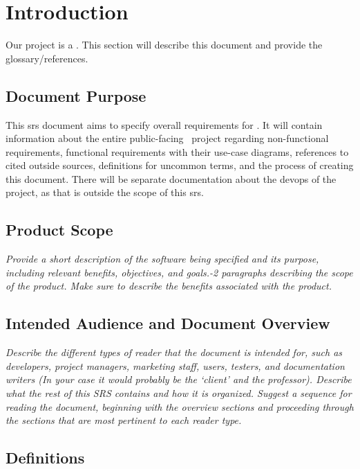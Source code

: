 
\section{Introduction}
    Our project is a \todo. This section will describe this document and provide the glossary/references.
    \subsection{Document Purpose}
        This \gls{srs} document aims to specify overall requirements for \projectName. It will contain information about the entire public-facing \projectName\ project regarding non-functional requirements, functional requirements with their use-case diagrams, references to cited outside sources, definitions for uncommon terms, and the process of creating this document. There will be separate documentation about the \gls{devops} of the project, as that is outside the scope of this \gls{srs}.
    \subsection{Product Scope}
        \emph{Provide a short description of the software being specified and its purpose, including relevant benefits, objectives, and goals.-2 paragraphs describing the scope of the product. Make sure to describe the benefits associated with the product.}
    \subsection{Intended Audience and Document Overview}
        \emph{Describe the different types of reader that the document is intended for, such as developers, project managers, marketing staff, users, testers, and documentation writers (In your case it would probably be the `client' and the professor). Describe what the rest of this SRS contains and how it is organized. Suggest a sequence for reading the document, beginning with the overview sections and proceeding through the sections that are most pertinent to each reader type.}
    \subsection{Definitions}
        \printnoidxglossary
        \printnoidxglossary[type=acronym, title=Acronyms and Abbreviations]
        \printacronyms
    \vspace{-4ex} %
